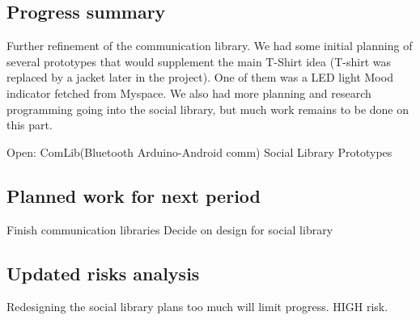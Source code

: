 \subsection{Progress summary}
Further refinement of the communication library. We had some initial planning of several prototypes that would supplement the main T-Shirt idea (T-shirt was replaced by a jacket later in the project). One of them was a LED light Mood indicator fetched from Myspace. We also had more planning and research programming going into the social library, but much work remains to be done on this part.

Open:
ComLib(Bluetooth Arduino-Android comm)
Social Library
Prototypes

\subsection{Planned work for next period}
Finish communication libraries
Decide on design for social library

\subsection{Updated risks analysis}
Redesigning the social library plans too much will limit progress. HIGH risk.